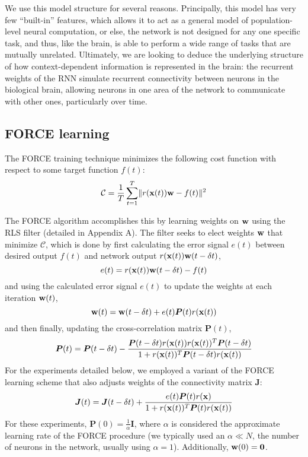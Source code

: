 \documentclass[12pt,a4paper,final]{iopart}
\begin{document}
We use this model structure for several reasons. Principally, this model has very few ``built-in'' features, which allows it to act as a general model of population-level neural computation, or else, the network is not designed for any one specific task, and thus, like the brain, is able to perform a wide range of tasks that are mutually unrelated. Ultimately, we are looking to deduce the underlying structure of how context-dependent information is represented in the brain: the recurrent weights of the RNN simulate recurrent connectivity between neurons in the biological brain, allowing neurons in one area of the network to communicate with other ones, particularly over time.

\subsection{FORCE learning}
The FORCE \cite{Sussillo} training technique minimizes the following cost function with respect to some target function $f(t)$:
\begin{equation*}
    \mathcal{C} = \frac{1}{T} \sum_{t = 1}^T \lVert r({\bf x}(t)){\bf w} - f(t) \rVert^2
\end{equation*}

The FORCE algorithm accomplishes this by learning weights on ${\bf w}$ using the RLS filter (detailed in Appendix A). The filter seeks to elect weights ${\bf w}$ that minimize $\mathcal{C}$, which is done by first calculating the error signal $e(t)$ between desired output $f(t)$ and network output $r({\bf x}(t)){\bf w}(t - \delta t)$,
\[
    e(t) = r({\bf x}(t)){\bf w}(t - \delta t) - f(t)
\]
and using the calculated error signal $e(t)$ to update the weights at each iteration ${\bf w}(t)$,
\[
    {\bf w}(t) = {\bf w}(t - \delta t) + e(t)\boldsymbol{P}(t)r({\bf x}(t))
\]
and then finally, updating the cross-correlation matrix $\boldsymbol{P}(t)$,
\[
    \boldsymbol{P}(t) = \boldsymbol{P}(t - \delta t) - \frac{\boldsymbol{P}(t-\delta t)r({\bf x}(t)) r({\bf x}(t))^T \boldsymbol{P}(t-\delta t)}{1 + r({\bf x}(t))^T\boldsymbol{P}(t-\delta t)r({\bf x}(t))}
\]
For the experiments detailed below, we employed a variant of the FORCE learning scheme that also adjusts weights of the connectivity matrix $\boldsymbol{J}$:
\[
    \boldsymbol{J}(t) = \boldsymbol{J}(t - \delta t) + \frac{e(t)\boldsymbol{P}(t)r({\bf x})}{1 + r({\bf x}(t))^T\boldsymbol{P}(t)r({\bf x}(t))}
\]
For these experiments, $\boldsymbol{P}(0) = \frac{1}{\alpha} \boldsymbol{I}$, where $\alpha$ is considered the approximate learning rate of the FORCE procedure (we typically used an $\alpha \ll N$, the number of neurons in the network, usually using $\alpha = 1$). Additionally, ${\bf w}(0) = \boldsymbol{0}$. 
\end{document}

